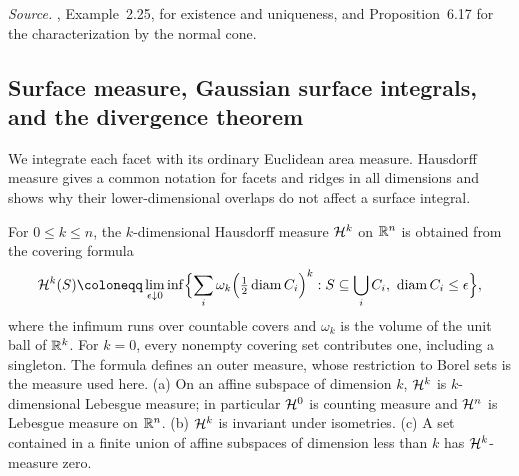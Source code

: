 \emph{Source.} , Example~2.25, for existence and uniqueness,
and Proposition~6.17 for the characterization by the normal cone.

\subsection{Surface measure, Gaussian surface integrals, and the
divergence theorem}\label{tb:sec:surface}

We integrate each facet with its ordinary Euclidean area measure.
Hausdorff measure gives a common notation for facets and ridges in
all dimensions and shows why their lower-dimensional overlaps do not
affect a surface integral.

\begin{fact}\label{tb:hausdorff}
For \(0\le k\le n\), the \(k\)-dimensional Hausdorff measure \(\mathcal H^k\) on
\(\mathbb R^n\) is obtained from the covering formula
\[
 \Haus^k(S)\coloneqq \lim_{\epsilon\downarrow0}\inf\Bigl\{\sum_i\omega_k
 \Bigl(\tfrac12\operatorname{diam}C_i\Bigr)^k:S\subseteq\bigcup_iC_i,\
 \operatorname{diam}C_i\le\epsilon\Bigr\},
\]
where the infimum runs over countable covers and \(\omega_k\) is
the volume of the unit ball of \(\mathbb R^k\).
For \(k=0\), every nonempty covering set contributes one, including
a singleton. The formula defines an outer measure, whose restriction
to Borel sets is the measure used here. (a) On an
affine subspace of dimension \(k\), \(\mathcal H^k\) is \(k\)-dimensional Lebesgue
measure; in particular \(\mathcal H^0\) is counting measure and \(\mathcal H^n\) is
Lebesgue measure on \(\mathbb R^n\). (b) \(\mathcal H^k\) is invariant under isometries.
(c) A set contained in a finite union of affine subspaces of dimension less
than \(k\) has \(\mathcal H^k\)-measure zero.
\end{fact}

